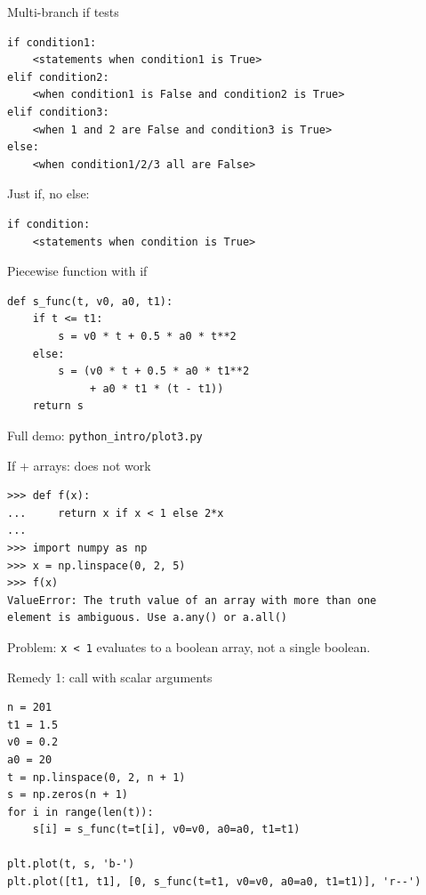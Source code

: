 \begin{frame}[fragile]{Multi-branch if tests}
\begin{lstlisting}[style=pythonTiny]
if condition1:
    <statements when condition1 is True>
elif condition2:
    <when condition1 is False and condition2 is True>
elif condition3:
    <when 1 and 2 are False and condition3 is True>
else:
    <when condition1/2/3 all are False>
\end{lstlisting}
  Just if, no else:
\begin{lstlisting}[style=pythoncompact]
if condition:
    <statements when condition is True>
\end{lstlisting}
\end{frame}

\begin{frame}[fragile]{Piecewise function with if}
\begin{lstlisting}[style=pythonTiny]
def s_func(t, v0, a0, t1):
    if t <= t1:
        s = v0 * t + 0.5 * a0 * t**2
    else:
        s = (v0 * t + 0.5 * a0 * t1**2
             + a0 * t1 * (t - t1))
    return s
\end{lstlisting}
  Full demo: \texttt{python\_intro/plot3.py}
\end{frame}

\begin{frame}[fragile]{If + arrays: does not work}
\begin{lstlisting}[style=pythonTiny]
>>> def f(x):
...     return x if x < 1 else 2*x
...
>>> import numpy as np
>>> x = np.linspace(0, 2, 5)
>>> f(x)
ValueError: The truth value of an array with more than one
element is ambiguous. Use a.any() or a.all()
\end{lstlisting}
  Problem: \texttt{x < 1} evaluates to a boolean array, not a single boolean.
\end{frame}

\begin{frame}[fragile]{Remedy 1: call with scalar arguments}
\begin{lstlisting}[style=pythonTiny]
n = 201
t1 = 1.5
v0 = 0.2
a0 = 20
t = np.linspace(0, 2, n + 1)
s = np.zeros(n + 1)
for i in range(len(t)):
    s[i] = s_func(t=t[i], v0=v0, a0=a0, t1=t1)

plt.plot(t, s, 'b-')
plt.plot([t1, t1], [0, s_func(t=t1, v0=v0, a0=a0, t1=t1)], 'r--')
\end{lstlisting}
\end{frame}

